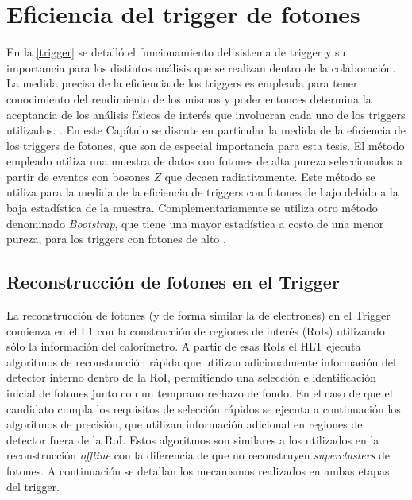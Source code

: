 \chapter{Eficiencia del trigger de fotones}



En la \autoref{trigger} se detalló el funcionamiento del sistema de trigger y su importancia para los distintos análisis que se realizan dentro de la colaboración. La medida precisa de la eficiencia de los triggers es empleada para tener conocimiento del rendimiento de los mismos y poder entonces determina la aceptancia de los análisis físicos de interés que involucran cada uno de los triggers utilizados. 
. En este Capítulo se discute en particular la medida de la eficiencia de los triggers de fotones, que son de especial importancia para esta tesis. El método empleado utiliza una muestra de datos con fotones de alta pureza seleccionados a partir de eventos con bosones $Z$ que decaen radiativamente. Este método se utiliza para la medida de la eficiencia de triggers con fotones de bajo \pt debido a la baja estadística de la muestra. Complementariamente se utiliza otro método denominado \textit{Bootstrap}, que tiene una mayor estadística a costo de una menor pureza, para los triggers con fotones de alto \pt. 


\section{Reconstrucción de fotones en el Trigger}

La reconstrucción de fotones \cite{TRIG-2018-05} (y de forma similar la de electrones) en el Trigger comienza en el L1 con la construcción de regiones de interés (RoIs) utilizando sólo la información del calorímetro. A partir de esas RoIs el HLT ejecuta algoritmos de reconstrucción rápida que utilizan adicionalmente información del detector interno dentro de la RoI, permitiendo una selección e identificación inicial de fotones junto con un temprano rechazo de fondo. En el caso de que el candidato cumpla los requisitos de selección rápidos se ejecuta a continuación los algoritmos de precisión, que utilizan información adicional en regiones del detector fuera de la RoI. Estos algoritmos son similares a los utilizados en la reconstrucción \textit{offline} con la diferencia de que no reconstruyen \textit{superclusters} de fotones. 
A continuación se detallan los mecanismos realizados en ambas etapas del trigger.

